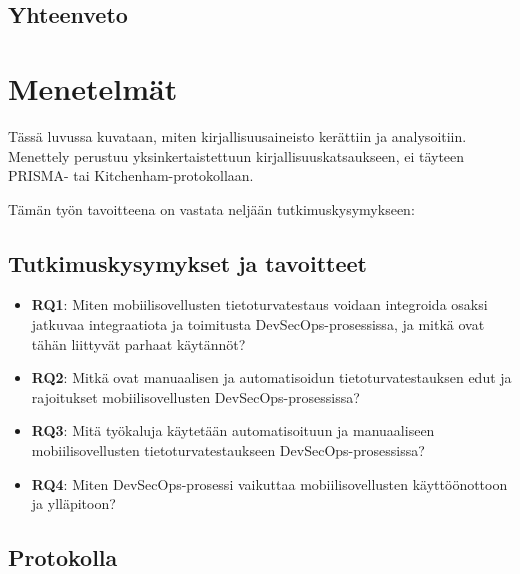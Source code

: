 \documentclass[bscthesis,finnish,oneside,biblatex]{uefcsthesis}
\begin{document}


    \section{Yhteenveto}
    \label{sec:teoria-yhteenveto}



    \chapter{Menetelmät}
    \label{cha:methods}

    Tässä luvussa kuvataan, miten kirjallisuusaineisto kerättiin ja analysoitiin. Menettely perustuu yksinkertaistettuun kirjallisuuskatsaukseen, ei täyteen PRISMA- tai Kitchenham-protokollaan.

    Tämän työn tavoitteena on vastata neljään tutkimuskysymykseen:


    \section{Tutkimuskysymykset ja tavoitteet}
    \label{sec:rq}
    \begin{itemize}
        \item \textbf{RQ1}: Miten mobiilisovellusten tietoturvatestaus voidaan integroida osaksi jatkuvaa integraatiota ja toimitusta DevSecOps-prosessissa, ja mitkä ovat tähän liittyvät parhaat käytännöt?
        \item \textbf{RQ2}: Mitkä ovat manuaalisen ja automatisoidun tietoturvatestauksen edut ja rajoitukset mobiilisovellusten DevSecOps-prosessissa?
        \item \textbf{RQ3}: Mitä työkaluja käytetään automatisoituun ja manuaaliseen mobiilisovellusten tietoturvatestaukseen DevSecOps-prosessissa?
        \item \textbf{RQ4}: Miten DevSecOps-prosessi vaikuttaa mobiilisovellusten käyttöönottoon ja ylläpitoon?
    \end{itemize}


    \section{Protokolla}
    \label{sec:protocol}
\end{document}

